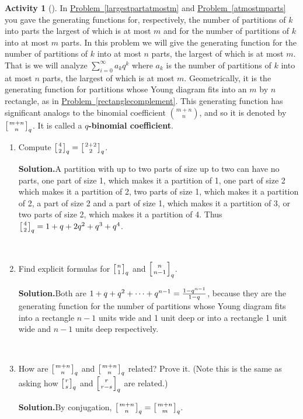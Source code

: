 \documentclass[10pt,]{book}
\newcommand{\terminology}[1]{\textbf{#1}}
\theoremstyle{plain}
\theoremstyle{definition}
\newtheorem{activity}[project]{Activity}
\numberwithin{equation}{chapter}
\newcommand{\qchoose}[2]{\left[{#1\atop#2}\right]_q}
\begin{document}
\begin{activity}[]\label{qtorialformula}
In \hyperref[largestpartatmostm]{Problem~\ref{largestpartatmostm}} and \hyperref[atmostmparts]{Problem~\ref{atmostmparts}} you gave the generating functions for, respectively, the number of partitions of \(k\) into parts the largest of which is at most \(m\) and for the number of partitions of \(k\) into at most \(m\) parts. In this problem we will give the generating function for the number of partitions of \(k\) into at most \(n\) parts, the largest of which is at most \(m\). That is we will analyze \(\sum_{i=0}^\infty a_kq^k\) where \(a_k\) is the number of partitions of \(k\) into at most \(n\) parts, the largest of which is at most \(m\). Geometrically, it is the generating function for partitions whose Young diagram fits into an \(m\) by \(n\) rectangle, as in \hyperref[rectanglecomplement]{Problem~\ref{rectanglecomplement}}. This generating function has significant analogs to the binomial coefficient \(\binom{m+n}{n}\), and so it is denoted by \(\qchoose{m+n}{n}\). It is called a \terminology{\(q\)-binomial coefficient}.%
~\par
\begin{enumerate}[label=(\alph*)]
 \item Compute \(\qchoose{4}{2}=\qchoose{2+2}{2}\).%
\par\medskip\noindent%
\textbf{Solution.}\quad A partition with up to two parts of size up to two can have no parts, one part of size 1, which makes it a partition of 1, one part of size 2 which makes it a partition of 2, two parts of size 1, which makes it a partition of 2, a part of size 2 and a part of size 1, which makes it a partition of 3, or two parts of size 2, which makes it a partition of 4. Thus \(\qchoose{4}{2}=1+q+2q^2+q^3+q^4\).%

~\par
\item Find explicit formulas for \(\qchoose{n}{1}\) and \(\qchoose{n}{n-1}\).%
\par\medskip\noindent%
\textbf{Solution.}\quad Both are \(1+q+q^2+\cdots+q^{n-1} = {1-q^{n-1}\over 1-q}\), because they are the generating function for the number of partitions whose Young diagram fits into a rectangle \(n-1\) units wide and 1 unit deep or into a rectangle 1 unit wide and \(n-1\) units deep respectively.%

~\par
\item How are \(\qchoose{m+n}{n}\) and \(\qchoose{m+n}{n}\) related? Prove it. (Note this is the same as asking how \(\qchoose{r}{s}\) and \(\qchoose{r}{r-s}\) are related.)%
\par\medskip\noindent%
\textbf{Solution.}\quad By conjugation, \(\qchoose{m+n}{n}=\qchoose{m+n}{m}\).%


\end{enumerate}
\end{activity}
\end{document}
